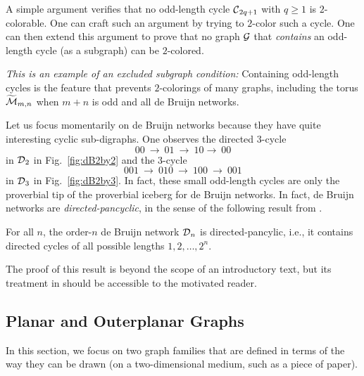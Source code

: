 A simple argument verifies that no odd-length cycle $\mbox{$\cal C$}_{2q+1}$ with $q \geq 1$ is $2$-colorable.  One can craft such an argument by trying to $2$-color such a cycle.  One can then extend this argument to prove that no graph $\mbox{$\cal G$}$ that {\em contains} an odd-length cycle (as a subgraph) can be $2$-colored.

{\em This is an example of an {\em excluded subgraph} condition:}  Containing odd-length cycles is the feature that prevents $2$-colorings of many graphs, including the torus $\widetilde{\mbox{$\cal M$}}_{m,n}$ when $m+n$ is odd and all de Bruijn networks.


\smallskip

Let us focus momentarily on de Bruijn networks because they have quite interesting cyclic sub-digraphs.  One observes the directed $3$-cycle
\[ 00 \ \rightarrow \ 01 \ \rightarrow \ 10  \rightarrow \ 00 \]
in $\mbox{$\cal D$}_2$ in Fig.~\ref{fig:dB2by2} and the $3$-cycle
\[ 001 \ \rightarrow \ 010 \ \rightarrow \ 100 \ \rightarrow \ 001 \]
in $\mbox{$\cal D$}_3$ in Fig.~\ref{fig:dB2by3}.  In fact, these small odd-length cycles are only the proverbial tip of the proverbial iceberg for de Bruijn networks.  In fact, de Bruijn networks are {\it directed-pancyclic}, in the sense of the following result from \cite{Yoeli62}.

  

\begin{prop}
\label{thm:DB-pancyclic}
For all $n$, the order-$n$ de Bruijn network $\mbox{$\cal D$}_n$ is directed-pancylic, i.e., it contains directed cycles of all possible lengths $1, 2, \ldots, 2^n$.
\end{prop}

The proof of this result is beyond the scope of an introductory text, but its treatment in \cite{Yoeli62} should be accessible to the motivated reader.

\subsection{Planar and Outerplanar Graphs}
\label{sec:planar+outerplanar-color}
 
 

In this section, we focus on two graph families that are defined in terms of the way they can be drawn (on a two-dimensional medium, such as a piece of paper).


